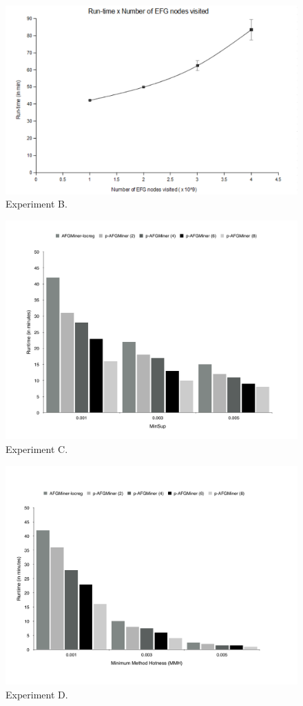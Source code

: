 \begin{figure}[h!]
\centering
    \includegraphics[scale=0.5]{figures/plot1.pdf}
    \caption{Experiment B.}
    \label{fig:Plot1}  
\end{figure}

\begin{figure}[h!]
\centering
    \includegraphics[scale=0.25]{figures/experimentC.pdf}
    \caption{Experiment C.}
    \label{fig:Plot3}  
\end{figure}

\begin{figure}[h!]
\centering
    \includegraphics[scale=0.25]{figures/experimentD.pdf}
    \caption{Experiment D.}
    \label{fig:Plot4}  
\end{figure}
